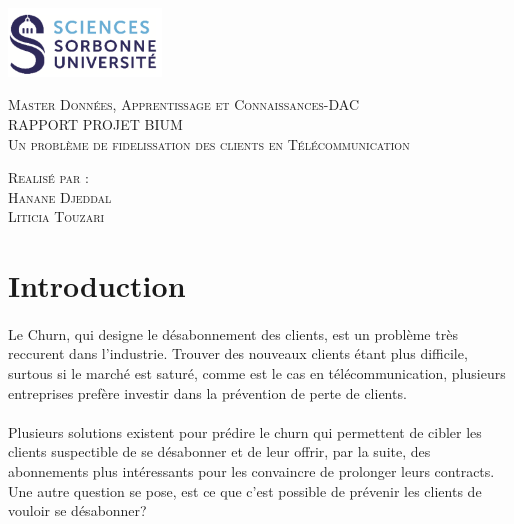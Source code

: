 \documentclass{article}
\begin{document}
\begin{titlepage}
    \begin{flushleft}
    \includegraphics[width=11em]{logo.png}\\[1.5cm]
    \end{flushleft}
    \begin{center}
        \textsc{{\LARGE \color{blue} Master Données, Apprentissage et Connaissances-DAC}}\\[5cm]
        \textsc{\huge{RAPPORT PROJET BIUM}}\\[1cm]
        \textsc{\vspace{10pt}\Huge{Un problème de fidelissation des clients en Télécommunication}}\\[4cm]
        \begin{minipage}{1\textwidth}
            \begin{flushleft} \large
            \textsc{\LARGE{Realisé par :}}\\[0.5cm]
            \textsc{Hanane Djeddal}\\
            \textsc{Liticia Touzari}\\[1.5 cm]
            \end{flushleft}
        \end{minipage}
        \vfill
    \end{center}
  \end{titlepage}
  

\tableofcontents					%


\newpage


\section{Introduction}
\paragraph{}
        Le Churn, qui designe le désabonnement des clients, est un problème très reccurent dans l'industrie.
        Trouver des nouveaux clients étant plus difficile, surtous si le marché est saturé, comme
        est le cas en télécommunication, plusieurs entreprises prefère investir dans 
        la prévention de perte de clients.
\paragraph{}
        Plusieurs solutions existent pour prédire le churn qui
        permettent de cibler les clients suspectible de se désabonner et de leur offrir, par la suite,
        des abonnements plus intéressants pour les convaincre de prolonger leurs contracts. Une autre 
        question se pose, est ce que c'est possible de prévenir les clients de vouloir se désabonner? 
\end{document}
